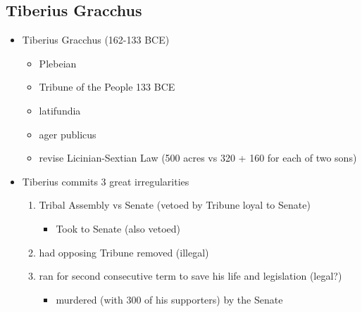 \documentclass[12pt, twoside]{article}
\begin{document}
\subsection{Tiberius Gracchus}
\begin{itemize}
\item Tiberius Gracchus (162-133 BCE)
	\begin{itemize}
	\item Plebeian
	\item Tribune of the People 133 BCE
	\item latifundia 
	\item ager publicus
	\item revise Licinian-Sextian Law (500 acres vs 320 + 160 for each of two sons)
	\end{itemize}
\item Tiberius commits 3 great irregularities
	\begin{enumerate}
	\item Tribal Assembly vs Senate (vetoed by Tribune loyal to Senate)
		\begin{itemize}
	 	\item Took to Senate (also vetoed)
	 	\end{itemize}
	\item had opposing Tribune removed (illegal)
	\item ran for second consecutive term to save his life and legislation (legal?)
		\begin{itemize}
		\item murdered (with 300 of his supporters) by the Senate
		\end{itemize}
	\end{enumerate}
\end{itemize}
\end{document}
